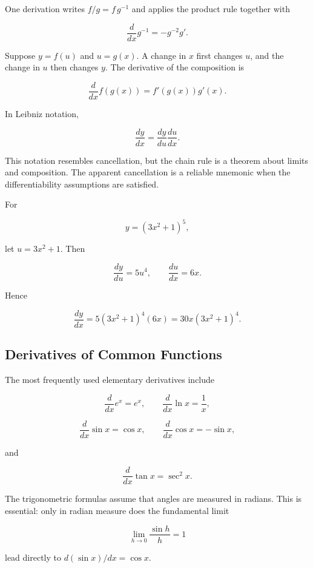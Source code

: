 One derivation writes $f/g=f\,g^{-1}$ and applies the product rule together with

\[
\frac{d}{dx}g^{-1}=-g^{-2}g'.
\]


Suppose $y=f(u)$ and $u=g(x)$. A change in $x$ first changes $u$, and the change in $u$ then changes $y$. The derivative of the composition is

\begin{equation}
\boxed{
\frac{d}{dx}f(g(x))
=f'(g(x))g'(x).
}
\label{eq:chain-rule}
\end{equation}

In Leibniz notation,

\[
\boxed{
\frac{dy}{dx}
=
\frac{dy}{du}\frac{du}{dx}.
}
\]

This notation resembles cancellation, but the chain rule is a theorem about limits and composition. The apparent cancellation is a reliable mnemonic when the differentiability assumptions are satisfied.

\begin{bookexample}
For

\[
y=(3x^2+1)^5,
\]

let $u=3x^2+1$. Then

\[
\frac{dy}{du}=5u^4,
\qquad
\frac{du}{dx}=6x.
\]

Hence

\[
\frac{dy}{dx}
=5(3x^2+1)^4(6x)
=30x(3x^2+1)^4.
\]
\end{bookexample}

\subsection{Derivatives of Common Functions}

The most frequently used elementary derivatives include

\[
\frac{d}{dx}e^x=e^x,
\qquad
\frac{d}{dx}\ln x=\frac1x,
\]

\[
\frac{d}{dx}\sin x=\cos x,
\qquad
\frac{d}{dx}\cos x=-\sin x,
\]

and

\[
\frac{d}{dx}\tan x=\sec^2x.
\]

The trigonometric formulas assume that angles are measured in radians. This is essential: only in radian measure does the fundamental limit

\[
\lim_{h\to0}\frac{\sin h}{h}=1
\]

lead directly to $d(\sin x)/dx=\cos x$.

